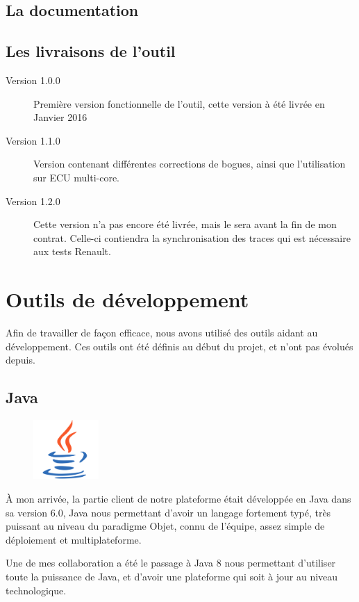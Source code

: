 \subsection{La documentation}

\subsection{Les livraisons de l'outil}
\begin{description}
\item[Version 1.0.0] Première version fonctionnelle de l'outil, cette version à été livrée en Janvier 2016
\item[Version 1.1.0] Version contenant différentes corrections de bogues, ainsi que l'utilisation sur ECU multi-core.
\item[Version 1.2.0] Cette version n'a pas encore été livrée, mais le sera avant la fin de mon contrat. Celle-ci contiendra la synchronisation des traces qui est nécessaire aux tests Renault. 
\end{description}


\section{Outils de développement}
Afin de travailler de façon efficace, nous avons utilisé des outils aidant au développement. Ces outils ont été définis au début du projet, et n'ont pas évolués depuis.

\subsection{Java}
\begin{figure}
	\includegraphics[width=2.5cm]{contents/images/logoJava.png}
\end{figure}
À mon arrivée, la partie client de notre plateforme était développée en Java dans sa version 6.0, Java nous permettant d'avoir un langage fortement typé, très puissant au niveau du paradigme Objet, connu de l'équipe, assez simple de déploiement et multiplateforme. 

Une de mes collaboration a été le passage à Java 8 nous permettant d'utiliser toute la puissance de Java, et d'avoir une plateforme qui soit à jour au niveau technologique.

